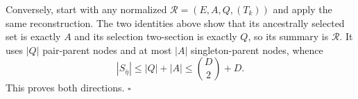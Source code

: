 Conversely, start with any normalized \(\mathcal R=(E,A,Q,(T_k))\) and apply the same reconstruction.  The two identities above show that its ancestrally selected set is exactly \(A\) and its selection two-section is exactly \(Q\), so its summary is \(\mathcal R\).  It uses \(|Q|\) pair-parent nodes and at most \(|A|\) singleton-parent nodes, whence
\[
|S_{\bar\eta}|\le |Q|+|A|\le\binom D2+D.
\]
This proves both directions. \(\square\)